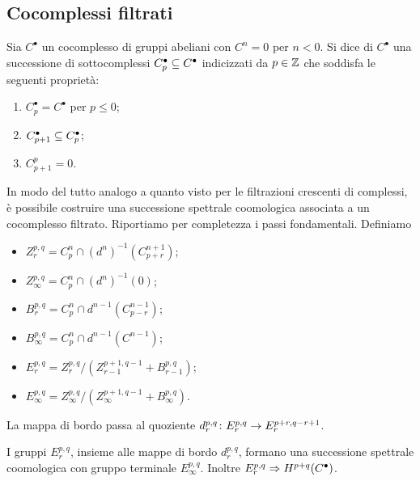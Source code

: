 \subsection{Cocomplessi filtrati}
\begin{definition}
Sia $C^\bullet$ un cocomplesso di gruppi abeliani con $C^n=0$ per $n<0$. Si dice  di $C^\bullet$ una successione di sottocomplessi $C_p^\bullet\subseteq C^\bullet$ indicizzati da $p\in\mathbb{Z}$ che soddisfa le seguenti proprietà:
\begin{enumerate}
\item $C_p^\bullet=C^\bullet$ per $p\le 0$;
\item $C_{p+1}^\bullet\subseteq C_p^\bullet$;
\item $C^p_{p+1}=0$.
\end{enumerate}
\end{definition}
In modo del tutto analogo a quanto visto per le filtrazioni crescenti di complessi, è possibile costruire una successione spettrale coomologica associata a un cocomplesso filtrato. Riportiamo per completezza i passi fondamentali. Definiamo
\begin{itemize}
\item $Z^{p,q}_r=C_p^n\cap (d^n)^{-1}(C_{p+r}^{n+1})$;
\item $Z^{p,q}_\infty=C_p^n\cap(d^n)^{-1}(0)$;
\item $B^{p,q}_r=C_p^n\cap d^{n-1}(C_{p-r}^{n-1})$;
\item $B^{p,q}_\infty=C_p^n\cap d^{n-1}(C^{n-1})$;
\item $E^{p,q}_r=Z^{p,q}_r/(Z^{p+1,q-1}_{r-1}+B^{p,q}_{r-1})$;
\item $E^{p,q}_\infty=Z^{p,q}_\infty/(Z^{p+1,q-1}_{\infty}+B^{p,q}_\infty)$.
\end{itemize}
La mappa di bordo passa al quoziente $\map{d^{p,q}_r}{E^{p,q}_r}{E^{p+r,q-r+1}_r}$.
\begin{proposition}
I gruppi $E^{p,q}_r$, insieme alle mappe di bordo $d^{p,q}_r$, formano una successione spettrale coomologica con gruppo terminale $E^{p,q}_\infty$. Inoltre $E^{p,q}_r\Rightarrow H^{p+q}(C^\bullet)$.
\end{proposition}

